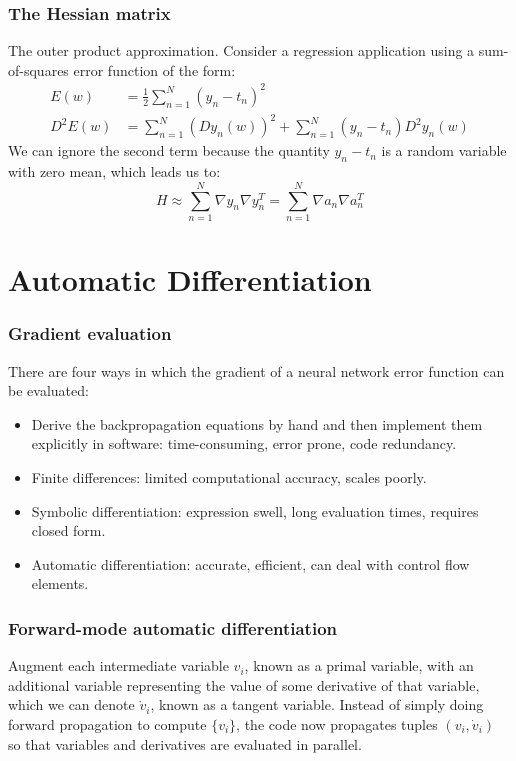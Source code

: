 \documentclass{beamer}
\begin{document}
\begin{frame}
    \frametitle{The Hessian matrix}
    The outer product approximation. Consider a regression application using a sum-of-squares error function of the form:
    \begin{align*}
        E(w)&=\frac{1}{2}\sum_{n=1}^{N}(y_{n}-t_{n})^{2} \\
        D^{2}E(w)&=\sum_{n=1}^{N}(Dy_{n}(w))^{2}+\sum_{n=1}^{N}(y_{n}-t_{n})D^{2}y_{n}(w)
    \end{align*}
    We can ignore the second term because the quantity $y_{n}-t_{n}$ is a random variable with zero mean, which leads us to:
    \begin{equation*}
        H\approx\sum_{n=1}^{N}\nabla{}y_{n}\nabla{}y_{n}^{T}=\sum_{n=1}^{N}\nabla{}a_{n}\nabla{}a_{n}^{T}
    \end{equation*}
\end{frame}

\section{Automatic Differentiation}

\begin{frame}
    \frametitle{Gradient evaluation}
    There are four ways in which the gradient of a neural network error function can be evaluated:
    \begin{itemize}
        \item Derive the backpropagation equations by hand and then implement them explicitly in software: time-consuming, error prone, code redundancy.
        \item Finite differences: limited computational accuracy, scales poorly.
        \item Symbolic differentiation: expression swell, long evaluation times, requires closed form.
        \item Automatic differentiation: accurate, efficient, can deal with control flow elements.
    \end{itemize}
\end{frame}

\begin{frame}
    \frametitle{Forward-mode automatic differentiation}
    Augment each intermediate variable $v_{i}$, known as a primal variable, with an additional variable representing the value of some derivative of that variable, which we can denote $\dot{v}_{i}$, known as a tangent variable.
    \bigbreak
    Instead of simply doing forward propagation to compute $\{v_{i}\}$, the code now propagates tuples $(v_{i},\dot{v}_{i})$ so that variables and derivatives are evaluated in parallel.
\end{frame}
\end{document}
